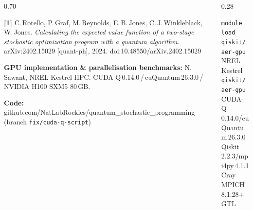 \documentclass[final]{beamer}
\begin{document}
\begin{frame}[t]{}
\vspace{0.4cm}
\begin{tcolorbox}[
    enhanced, arc=0pt, boxrule=0pt,
    colback=titleblue, colframe=titleblue,
    top=10pt, bottom=10pt, left=6pt, right=6pt,
    before skip=0pt, after skip=0pt,
]
\begin{columns}[T,totalwidth=\linewidth]
  \begin{column}{0.70\linewidth}
    {\color{white}\small\raggedright\sloppy
      \textbf{[1]}\;
      C.\,Rotello, P.\,Graf, M.\,Reynolds, E.\,B.\,Jones,
      C.\,J.\,Winkleblack, W.\,Jones.
      \textit{Calculating the expected value function of a two-stage stochastic
      optimization program with a quantum algorithm.}
      arXiv:2402.15029 [quant-ph], 2024.\;
      doi:10.48550/arXiv.2402.15029

      \vspace{0.2cm}
      \textbf{GPU implementation \& parallelisation benchmarks:}\;
      N.\,Sawant, NREL Kestrel HPC.\;
      CUDA-Q\,0.14.0\,/\,cuQuantum\,26.3.0\,/\,NVIDIA H100 SXM5 80\,GB.

      \vspace{0.2cm}
      \textbf{Code:}\;
      github.com/NatLabRockies/quantum\_stochastic\_programming
      \;(branch \texttt{fix/cuda-q-script})
    }
  \end{column}
  \begin{column}{0.28\linewidth}
    {\color{white!80!black}\small\raggedright
      \texttt{module load qiskit/aer-gpu}\\[3pt]
      NREL Kestrel \textemdash{} \texttt{qiskit/aer-gpu}\\
      CUDA-Q\,0.14.0\;/\;cuQuantum\,26.3.0\\
      Qiskit\,2.2.3\;/\;mpi4py\,4.1.1\\
      Cray MPICH\,8.1.28\;+\;GTL
    }
  \end{column}
\end{columns}
\end{tcolorbox}

\end{frame}
\end{document}
